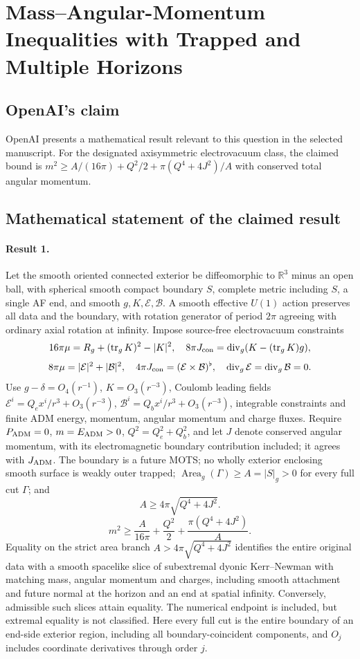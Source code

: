\documentclass[11pt]{article}
\begin{document}
\section*{Mass–Angular-Momentum Inequalities with Trapped and Multiple Horizons}

\subsection{OpenAI's claim}
OpenAI presents a mathematical result relevant to this question in the selected manuscript. For the designated axisymmetric electrovacuum class, the claimed bound is $m^2\geq A/(16\pi)+Q^2/2+\pi(Q^4+4J^2)/A$ with conserved total angular momentum.

\subsection{Mathematical statement of the claimed result}
\paragraph{Result 1.} Let the smooth oriented connected exterior be diffeomorphic to \(\mathbb R^3\) minus an open ball, with spherical smooth compact boundary \(S\), complete metric including \(S\), a single AF end, and smooth \(g,K,\mathcal E,\mathcal B\). A smooth effective \(U(1)\) action preserves all data and the boundary, with rotation generator of period \(2\pi\) agreeing with ordinary axial rotation at infinity. Impose source-free electrovacuum constraints
\[
16\pi\mu=R_g+(\operatorname{tr}_gK)^2-|K|^2,
\quad 8\pi J_{\rm con}=\operatorname{div}_g(K-(\operatorname{tr}_gK)g),
\]
\[
8\pi\mu=|\mathcal E|^2+|\mathcal B|^2,\quad
4\pi J_{\rm con}=(\mathcal E\times\mathcal B)^\flat,\quad
\operatorname{div}_g\mathcal E=\operatorname{div}_g\mathcal B=0.
\]
Use \(g-\delta=O_4(r^{-1})\), \(K=O_3(r^{-3})\), Coulomb leading fields
\(\mathcal E^i=Q_e x^i/r^3+O_3(r^{-3})\), \(\mathcal B^i=Q_b x^i/r^3+O_3(r^{-3})\), integrable constraints and finite ADM energy, momentum, angular momentum and charge fluxes. Require \(P_{\rm ADM}=0\), \(m=E_{\rm ADM}>0\), \(Q^2=Q_e^2+Q_b^2\), and let \(J\) denote conserved angular momentum, with its electromagnetic boundary contribution included; it agrees with \(J_{\rm ADM}\). The boundary is a future MOTS; no wholly exterior enclosing smooth surface is weakly outer trapped; \(\operatorname{Area}_g(\Gamma)\ge A=|S|_g>0\) for every full cut \(\Gamma\); and
\[A\ge4\pi\sqrt{Q^4+4J^2}.\]
\[
m^2\ge\frac{A}{16\pi}+\frac{Q^2}{2}+\frac{\pi(Q^4+4J^2)}{A}.
\]
Equality on the strict area branch \(A>4\pi\sqrt{Q^4+4J^2}\) identifies the entire original data with a smooth spacelike slice of subextremal dyonic Kerr--Newman with matching mass, angular momentum and charges, including smooth attachment and future normal at the horizon and an end at spatial infinity. Conversely, admissible such slices attain equality. The numerical endpoint is included, but extremal equality is not classified. Here every full cut is the entire boundary of an end-side exterior region, including all boundary-coincident components, and $O_j$ includes coordinate derivatives through order $j$.
\end{document}
